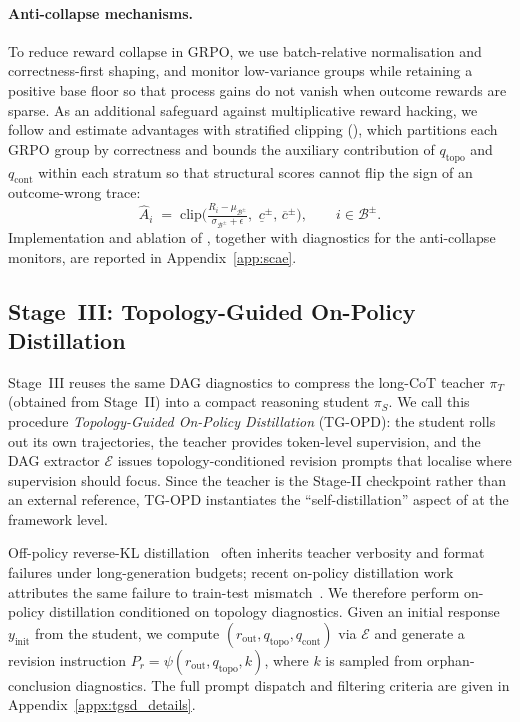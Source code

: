 \paragraph{Anti-collapse mechanisms.}
To reduce reward collapse in GRPO, we use batch-relative normalisation and correctness-first shaping, and monitor low-variance groups while retaining a positive base floor so that process gains do not vanish when outcome rewards are sparse. As an additional safeguard against multiplicative reward hacking, we follow \citet{liu2026graph} and estimate advantages with stratified clipping (\estimation), which partitions each GRPO group by correctness and bounds the auxiliary contribution of $q_{\mathrm{topo}}$ and $q_{\mathrm{cont}}$ within each stratum so that structural scores cannot flip the sign of an outcome-wrong trace:
\begin{equation}
\label{eq:scae}
\widehat{A}_i \;=\;
\mathrm{clip}\!\Big(\tfrac{R_i-\mu_{\mathcal{B}^{\pm}}}{\sigma_{\mathcal{B}^{\pm}}+\epsilon},\,
\,\underline{c}^{\pm},\,\overline{c}^{\pm}\Big),
\qquad i\in\mathcal{B}^{\pm}.
\end{equation}
Implementation and ablation of \estimation, together with diagnostics for the anti-collapse monitors, are reported in Appendix~\ref{app:scae}.

\subsection{Stage~III: Topology-Guided On-Policy Distillation}
\label{sec:compression}
\label{sec:tgsd}

Stage~III reuses the same DAG diagnostics to compress the long-CoT teacher $\pi_T$ (obtained from Stage~II) into a compact reasoning student $\pi_S$.
We call this procedure \emph{Topology-Guided On-Policy Distillation} (TG-OPD): the student rolls out its own trajectories, the teacher provides token-level supervision, and the DAG extractor $\mathcal{E}$ issues topology-conditioned revision prompts that localise where supervision should focus.
Since the teacher is the Stage-II \method checkpoint rather than an external reference, TG-OPD instantiates the ``self-distillation'' aspect of \framework at the framework level.

Off-policy reverse-KL distillation~\citep{hinton2015distilling,minillm2023} often inherits teacher verbosity and format failures under long-generation budgets; recent on-policy distillation work attributes the same failure to train-test mismatch~\citep{agarwal2024gkd,opsdc2026,song2026opdsurvey}.
We therefore perform on-policy distillation conditioned on topology diagnostics.
Given an initial response $y_{\mathrm{init}}$ from the student, we compute $(r_{\mathrm{out}}, q_{\mathrm{topo}}, q_{\mathrm{cont}})$ via $\mathcal{E}$ and generate a revision instruction
$P_r=\psi(r_{\mathrm{out}},q_{\mathrm{topo}},k)$, where $k$ is sampled from orphan-conclusion diagnostics.
The full prompt dispatch and filtering criteria are given in Appendix~\ref{appx:tgsd_details}.

